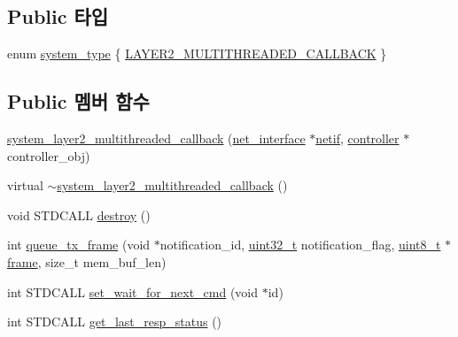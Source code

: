 \subsection*{Public 타입}
\begin{DoxyCompactItemize}
\item 
enum \hyperlink{classavdecc__lib_1_1system_aacdda6e9ef910c6762dd50aefd8ee5bb}{system\+\_\+type} \{ \hyperlink{classavdecc__lib_1_1system_aacdda6e9ef910c6762dd50aefd8ee5bba88df7608630d8183aa6d68acffce3680}{L\+A\+Y\+E\+R2\+\_\+\+M\+U\+L\+T\+I\+T\+H\+R\+E\+A\+D\+E\+D\+\_\+\+C\+A\+L\+L\+B\+A\+CK}
 \}
\end{DoxyCompactItemize}
\subsection*{Public 멤버 함수}
\begin{DoxyCompactItemize}
\item 
\hyperlink{classavdecc__lib_1_1system__layer2__multithreaded__callback_ad2564e57026870ea970297f966d48217}{system\+\_\+layer2\+\_\+multithreaded\+\_\+callback} (\hyperlink{classavdecc__lib_1_1net__interface}{net\+\_\+interface} $\ast$\hyperlink{structnetif}{netif}, \hyperlink{classavdecc__lib_1_1controller}{controller} $\ast$controller\+\_\+obj)
\item 
virtual \hyperlink{classavdecc__lib_1_1system__layer2__multithreaded__callback_aa16a9e759367f51ac4000d1de4d88e88}{$\sim$system\+\_\+layer2\+\_\+multithreaded\+\_\+callback} ()
\item 
void S\+T\+D\+C\+A\+LL \hyperlink{classavdecc__lib_1_1system__layer2__multithreaded__callback_a644cfaa829dbec5c28d5d29a6789e8c4}{destroy} ()
\item 
int \hyperlink{classavdecc__lib_1_1system__layer2__multithreaded__callback_ae99ddb9003d119d56bd3be4db55f5320}{queue\+\_\+tx\+\_\+frame} (void $\ast$notification\+\_\+id, \hyperlink{parse_8c_a6eb1e68cc391dd753bc8ce896dbb8315}{uint32\+\_\+t} notification\+\_\+flag, \hyperlink{stdint_8h_aba7bc1797add20fe3efdf37ced1182c5}{uint8\+\_\+t} $\ast$\hyperlink{gst__avb__playbin_8c_ac8e710e0b5e994c0545d75d69868c6f0}{frame}, size\+\_\+t mem\+\_\+buf\+\_\+len)
\item 
int S\+T\+D\+C\+A\+LL \hyperlink{classavdecc__lib_1_1system__layer2__multithreaded__callback_a278bd918301de3c19d22e7d1d906f159}{set\+\_\+wait\+\_\+for\+\_\+next\+\_\+cmd} (void $\ast$id)
\item 
int S\+T\+D\+C\+A\+LL \hyperlink{classavdecc__lib_1_1system__layer2__multithreaded__callback_ac0f9c7a224fa2168344a9a819bba69f9}{get\+\_\+last\+\_\+resp\+\_\+status} ()

\end{DoxyCompactItemize}
